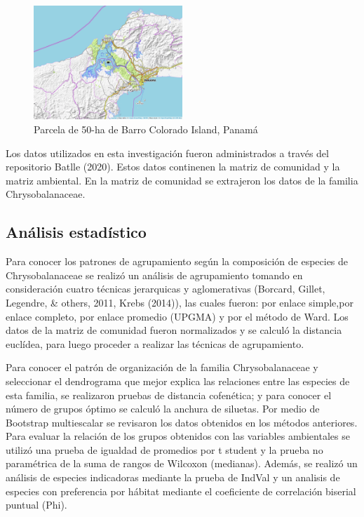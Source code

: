 \documentclass[11pt,]{article}
\begin{document}
\begin{figure}
\centering
\includegraphics[width=0.50000\textwidth]{mapa_cuadros_panama.png}
\caption{Parcela de 50-ha de Barro Colorado Island,
Panamá\label{mapaBCIcuadros}}
\end{figure}

Los datos utilizados en esta investigación fueron administrados a través
del repositorio Batlle (2020). Estos datos continenen la matriz de
comunidad y la matriz ambiental. En la matriz de comunidad se extrajeron
los datos de la familia Chrysobalanaceae.

\subsection{Análisis estadístico}\label{anuxe1lisis-estaduxedstico}

Para conocer los patrones de agrupamiento según la composición de
especies de Chrysobalanaceae se realizó un análisis de agrupamiento
tomando en consideración cuatro técnicas jerarquicas y aglomerativas
(Borcard, Gillet, Legendre, \& others, 2011, Krebs (2014)), las cuales
fueron: por enlace simple,por enlace completo, por enlace promedio
(UPGMA) y por el método de Ward. Los datos de la matriz de comunidad
fueron normalizados y se calculó la distancia euclídea, para luego
proceder a realizar las técnicas de agrupamiento.

Para conocer el patrón de organización de la familia Chrysobalanaceae y
seleccionar el dendrograma que mejor explica las relaciones entre las
especies de esta familia, se realizaron pruebas de distancia cofenética;
y para conocer el número de grupos óptimo se calculó la anchura de
siluetas. Por medio de Bootstrap multiescalar se revisaron los datos
obtenidos en los métodos anteriores. Para evaluar la relación de los
grupos obtenidos con las variables ambientales se utilizó una prueba de
igualdad de promedios por t student y la prueba no paramétrica de la
suma de rangos de Wilcoxon (medianas). Además, se realizó un análisis de
especies indicadoras mediante la prueba de IndVal y un analisis de
especies con preferencia por hábitat mediante el coeficiente de
correlación biserial puntual (Phi).
\end{document}
